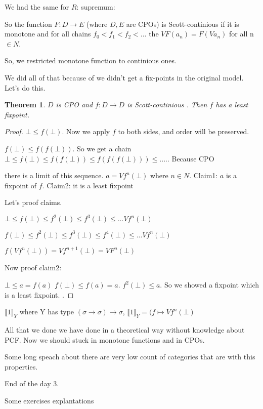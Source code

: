 \documentclass[a4paper,10pt]{book}
\newtheorem{theorem}{Theorem}
\newcommand{\sem}[2]{ \llbracket#1\rrbracket_{#2} }
\newcommand{\rarr}{ \rightarrow }
\begin{document}
We had the same for $R$: supremum:

So the function $F: D \rarr E$  (where $D,E$ are CPOs) is Scott-continious 
if it is monotone and for all chains  $f_0 < f_1 < f_2 < ...$
the $V F(a_n) = F(V a_n)$ for all n $\in N$.

So, we restricted monotone function to continious ones. 

We did all of that because of we didn't get a fix-points in the original model. Let's do this.


\begin{theorem}
$D$ is CPO and $f: D \rarr D$ is Scott-continious . Then $f$ has a least fixpoint.
\end{theorem}
\begin{proof}
$\bot \leq f(\bot)$. Now we apply $f$ to both sides, and order will be preserved.

$f(\bot) \leq  f(f(\bot))$. So we get a chain
$\bot \leq f(\bot) \leq f(f(\bot)) \leq f(f(f(\bot))) \leq ....$. Because CPO


there is a limit of this sequence. $a = Vf^n(\bot)$ where $n\in N$. 
Claim1: $a$ is a fixpoint of $f$.
Claim2: it is a least fixpoint

Let's proof claims.

$\bot \leq f(\bot) \leq f^2(\bot) \leq f^3(\bot) \leq ... Vf^n(\bot)$

$f(\bot) \leq f^2(\bot) \leq f^3(\bot) \leq f^4(\bot) \leq ... Vf^n(\bot)$

$f(Vf^n(\bot)) = Vf^{n+1}(\bot) = VF^n(\bot)$

Now proof claim2:
 
 $\bot \leq a = f(a)$
 $f(\bot) \leq f(a) = a$.
 $f^2(\bot) \leq a$.  So we showed a fixpoint which is a least fixpoint.
.
\end{proof}

$\sem1{Y}$ where Y has type $(\sigma\rarr\sigma)\rarr\sigma$,
$\sem1{Y} = (f \mapsto V f^n(\bot)$

All that we done we have done in a theoretical way without knowledge about PCF. Now we
should stuck in monotone functions and in CPOs.

Some long speach about there are very low count of categories that are with this properties.

End of the day 3.


Some exercises explantations
\end{document}
